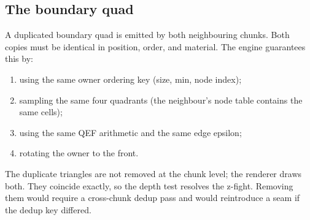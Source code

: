 \subsection{The boundary quad}

A duplicated boundary quad is emitted by both neighbouring chunks.  Both
copies must be identical in position, order, and material.  The engine
guarantees this by:
\begin{enumerate}
\item using the same owner ordering key (size, min, node index);
\item sampling the same four quadrants (the neighbour's node table contains
  the same cells);
\item using the same QEF arithmetic and the same edge epsilon;
\item rotating the owner to the front.
\end{enumerate}
The duplicate triangles are not removed at the chunk level; the renderer
draws both.  They coincide exactly, so the depth test resolves the
z-fight.  Removing them would require a cross-chunk dedup pass and would
reintroduce a seam if the dedup key differed.

